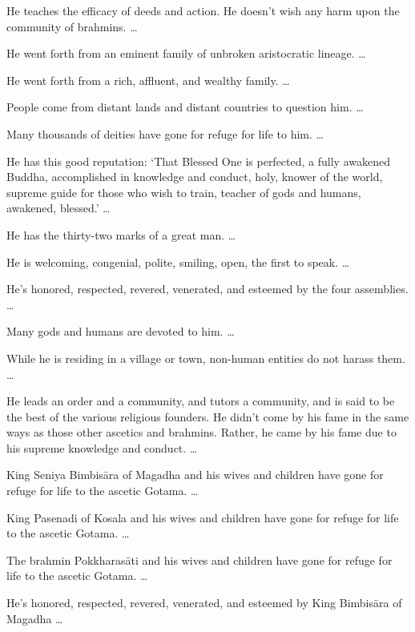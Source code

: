 \documentclass[12pt,openany]{book}%
\begin{document}
He teaches the efficacy of deeds and action. He doesn’t wish any harm upon the community of brahmins. … 

He went forth from an eminent family of unbroken aristocratic lineage. … 

He went forth from a rich, affluent, and wealthy family. … 

People come from distant lands and distant countries to question him. … 

Many thousands of deities have gone for refuge for life to him. … 

He has this good reputation: ‘That Blessed One is perfected, a fully awakened Buddha, accomplished in knowledge and conduct, holy, knower of the world, supreme guide for those who wish to train, teacher of gods and humans, awakened, blessed.’ … 

He has the thirty-two marks of a great man. … 

He is welcoming, congenial, polite, smiling, open, the first to speak. … 

He’s honored, respected, revered, venerated, and esteemed by the four assemblies. … 

Many gods and humans are devoted to him. … 

While he is residing in a village or town, non-human entities do not harass them. … 

He leads an order and a community, and tutors a community, and is said to be the best of the various religious founders. He didn’t come by his fame in the same ways as those other ascetics and brahmins. Rather, he came by his fame due to his supreme knowledge and conduct. … 

King Seniya \textsanskrit{Bimbisāra} of Magadha and his wives and children have gone for refuge for life to the ascetic Gotama. … 

King Pasenadi of Kosala and his wives and children have gone for refuge for life to the ascetic Gotama. … 

The brahmin \textsanskrit{Pokkharasāti} and his wives and children have gone for refuge for life to the ascetic Gotama. … 

He’s honored, respected, revered, venerated, and esteemed by King \textsanskrit{Bimbisāra} of Magadha … 
\end{document}
